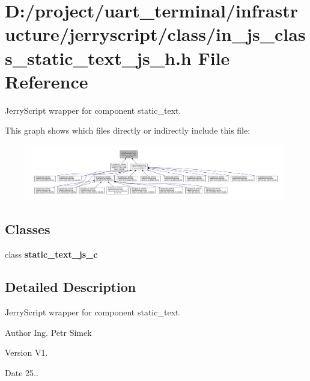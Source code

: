 \section{D\+:/project/uart\+\_\+terminal/infrastructure/jerryscript/class/in\+\_\+js\+\_\+class\+\_\+static\+\_\+text\+\_\+js\+\_\+h.h File Reference}
\label{in__js__class__static__text__js__h_8h}


Jerry\+Script wrapper for component static\+\_\+text.  


This graph shows which files directly or indirectly include this file\+:
\nopagebreak
\begin{figure}[H]
\begin{center}
\leavevmode
\includegraphics[width=350pt]{in__js__class__static__text__js__h_8h__dep__incl}
\end{center}
\end{figure}
\subsection*{Classes}
\begin{DoxyCompactItemize}
\item 
class \textbf{ static\+\_\+text\+\_\+js\+\_\+c}
\end{DoxyCompactItemize}


\subsection{Detailed Description}
Jerry\+Script wrapper for component static\+\_\+text. 

\begin{DoxyAuthor}{Author}
Ing. Petr Simek 
\end{DoxyAuthor}
\begin{DoxyVersion}{Version}
V1. 
\end{DoxyVersion}
\begin{DoxyDate}{Date}
25.. 
\end{DoxyDate}

